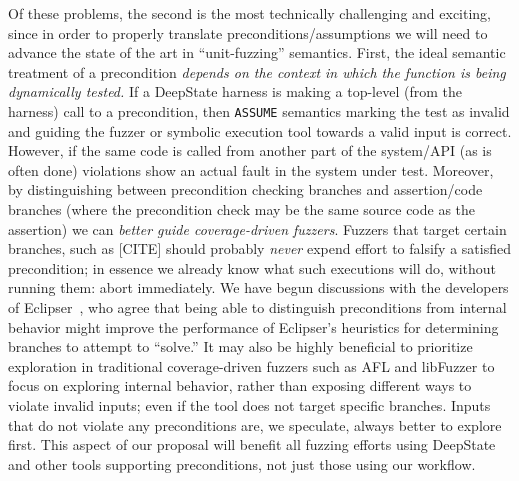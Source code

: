 Of these problems, the second is the most technically  challenging and exciting, since in order to properly translate preconditions/assumptions we will need to advance the state of the art in ``unit-fuzzing'' semantics.  First, the ideal semantic treatment of a precondition \emph{depends on the context in which the function is being dynamically tested.}  If a DeepState harness is making a top-level (from the harness) call to a precondition, then {\tt ASSUME} semantics marking the test as invalid and guiding the fuzzer or symbolic execution tool towards a valid input is correct.  However, if the same code is called from another part of the system/API (as is often done) violations show an actual fault in the system under test.  Moreover, by distinguishing between precondition checking branches and assertion/code branches (where the precondition check may be the same source code as the assertion) we can \emph{better guide coverage-driven fuzzers}.  Fuzzers that target certain branches, such as [CITE] should probably \emph{never} expend effort to falsify a satisfied precondition; in essence we already know what such executions will do, without running them: abort immediately.  We have begun discussions with the developers of Eclipser~\cite{Eclipser}, who agree that being able to distinguish preconditions from internal behavior might improve the performance of Eclipser's heuristics for determining branches to attempt to ``solve.''  It may also be highly beneficial to prioritize exploration in traditional coverage-driven fuzzers such as AFL and libFuzzer to focus on exploring internal behavior, rather than exposing different ways to violate invalid inputs; even if the tool does not target specific branches.  Inputs that do not violate any preconditions are, we speculate, always better to explore first.  This aspect of our proposal will benefit all fuzzing efforts using DeepState and other tools supporting preconditions, not just those using our workflow.

